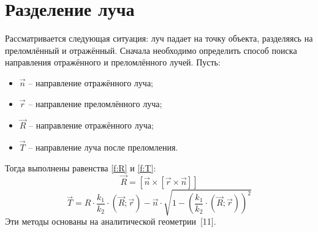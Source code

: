 \section{Разделение луча} {
    Рассматривается следующая ситуация: луч падает на точку объекта,
    разделяясь на преломлённый и отражённый.
    Сначала необходимо определить способ поиска
    направления отражённого и преломлённого лучей.
    Пусть:
    \begin{itemize}
        \item $\vec{n}$ -- направление отражённого луча;
        \item $\vec{r}$ -- направление преломлённого луча;
        \item $\vec{R}$ -- направление отражённого луча;
        \item $\vec{T}$ -- направление луча после преломления.
    \end{itemize}
    Тогда выполнены равенства \ref{f:R} и \ref{f:T}:
    \begin{equation}
        \label{f:R}
        \vec{R} = [\vec{n} \times [\vec{r} \times \vec{n}]]
    \end{equation}
    \begin{equation}
        \label{f:T}
        \vec{T} = R \cdot \frac{k_1}{k_2}
        \cdot (\vec{R}; \vec{r}) - \vec{n} \cdot
        \sqrt{ 1 - (\frac{k_1}{k_2} \cdot (\vec{R}; \vec{r}))^2 }
    \end{equation}
    Эти методы основаны на аналитической геометрии~[11].
    
}
